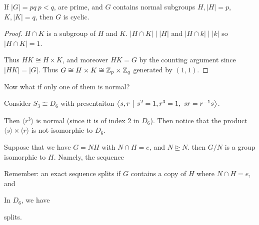 \documentclass[12pt, twosided]{article}
\begin{document}
\begin{lm}
  If \(|G| = pq\ p <q\), are prime, and \(G\) contains normal subgroups \(H, |H| = p\), \(K, |K| = q\), then \(G\) is cyclic.
\end{lm}
\begin{proof}
  \(H \cap K\) is a subgroup of \(H\) and \(K\). \(|H \cap K| \mid |H|\) and \(|H \cap k| \mid |k|\) so \(|H \cap K| = 1\).

  Thus \(HK \cong H \times K\), and moreover \(HK = G\) by the counting argument since \(|HK| = |G|\). Thus \(G \cong H \times K \cong \mathbb{Z}_p \times \mathbb{Z}_q\) generated by \((1,1)\).
\end{proof}

Now what if only one of them is normal?

\begin{exa}
  Consider \(S_3 \cong D_6\) with presentaiton \(\left\langle s, r \ \middle\vert\  s^2 = 1, r^3 = 1,\ sr = r^{-1}s \right\rangle\).

  Then \(\langle r^3 \rangle\) is normal (since it is of index 2 in \(D_6\)). Then notice that the product \(\langle s \rangle \times \langle r \rangle\) is not isomorphic to \(D_6\). 
\end{exa}

Suppose that we have \(G = NH\) with \(N \cap H = e\), and \(N \trianglerighteq N\). then \(G/N\) is a group isomorphic to \(H\). Namely, the sequence

\begin{center}
\end{center}

Remember: an exact sequence splits if \(G\) contains a copy of \(H\) where \(N \cap H = e\), and

\begin{center}
\end{center}

\begin{exa}
  In \(D_6\), we have
  \begin{center}
  \end{center}
  splits.
\end{exa}
\end{document}
